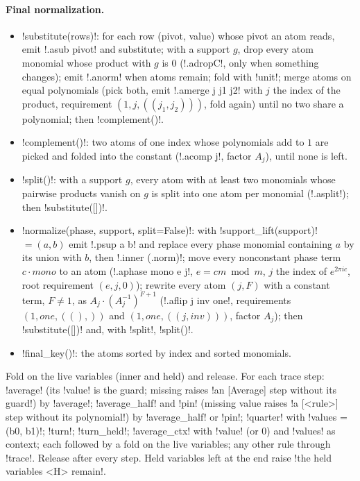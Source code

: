 {{{\paragraph{Final normalization.}
\begin{itemize}
\item \lexpy!substitute(rows)!: for each row (pivot, value) whose pivot an atom reads, emit
\lexlean!.asub pivot! and substitute; with a support $g$, drop every atom monomial whose product
with $g$ is 0 (\lexlean!.adropC!, only when something changes); emit \lexlean!.anorm! when atoms
remain; fold with \lexcode!unit!; merge atoms on equal polynomials (pick both, emit
\lexlean!.amerge j j1 j2! with $j$ the index of the product, requirement $(1, j, ((j_1, j_2)))$,
fold again) until no two share a polynomial; then \lexpy!complement()!.
\item \lexpy!complement()!: two atoms of one index whose polynomials add to $1$ are picked and
folded into the constant (\lexlean!.acomp j!, factor $A_j$), until none is left.
\item \lexpy!split()!: with a support $g$, every atom with at least two monomials whose pairwise
products vanish on $g$ is split into one atom per monomial (\lexlean!.asplit!); then
\lexpy!substitute([])!.
\item \lexpy!normalize(phase, support, split=False)!: with \lexpy!support_lift(support)! $=(a,b)$
emit \lexlean!.psup a b! and replace every phase monomial containing $a$ by its union with $b$,
then \lexlean!.inner (.norm)!; move every nonconstant phase term $c\cdot\mathit{mono}$ to an atom
(\lexlean!.aphase mono e j!, $e = cm \bmod m$, $j$ the index of $e^{2\pi i c}$, root requirement
$(e, j, 0)$); rewrite every atom $(j, F)$ with a constant term, $F \neq 1$, as
$A_j\cdot(A_j^{-1})^{F+1}$ (\lexlean!.aflip j inv one!, requirements $(1, \mathit{one}, ((),))$ and
$(1, \mathit{one}, ((j,\mathit{inv})))$, factor $A_j$); then \lexpy!substitute([])! and, with
\lexcode!split!, \lexpy!split()!.
\item \lexpy!final_key()!: the atoms sorted by index and sorted monomials.
\end{itemize}

\begin{algorithm}\label{alg:lean-export-reduce-run}
Fold on the live variables (inner and held) and release. For each trace step: \lexcode!average!
(its \lexpy!value! is the guard; missing raises \lexcode!an [Average] step without its guard!) by
\lexpy!average!; \lexcode!average_half! and \lexcode!pin! (missing value raises \lexcode!a [<rule>] step without its polynomial!) by \lexpy!average_half! or \lexpy!pin!; \lexcode!quarter! with
\lexpy!values = (b0, b1)!; \lexcode!turn!; \lexcode!turn_held!; \lexcode!average_ctx! with
\lexpy!value! (or 0) and \lexpy!values! as context; each followed by a fold on the live variables;
any other rule through \lexpy!trace!. Release after every step. Held variables left at the end
raise \lexcode!the held variables <H> remain!.
\end{algorithm}

}}}
